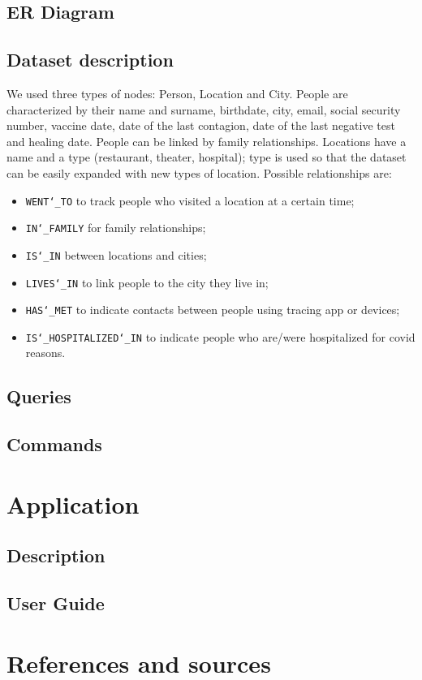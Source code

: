 \documentclass[12pt, a4paper]{article}
\begin{document}
\subsection{ER Diagram}

\blindtext

\subsection{Dataset description}

We used three types of nodes: Person, Location and City. 
People are characterized by their name and surname, birthdate, city, email, social security number, vaccine date, date of the last contagion, date of the last negative test and healing date. People can be linked by family relationships.
Locations have a name and a type (restaurant, theater, hospital); type is used so that the dataset can be easily expanded with new types of location.
Possible relationships are: 
\begin{itemize}
	\item \texttt{WENT\char`_TO} to track people who visited a location at a certain time;
	\item \texttt{IN\char`_FAMILY} for family relationships;
	\item \texttt{IS\char`_IN} between locations and cities;
	\item \texttt{LIVES\char`_IN} to link people to the city they live in;
	\item \texttt{HAS\char`_MET} to indicate contacts between people using tracing app or devices;
	\item \texttt{IS\char`_HOSPITALIZED\char`_IN} to indicate people who are/were hospitalized for covid reasons.
\end{itemize}

\subsection{Queries}

\blindtext

\subsection{Commands}

\blindtext

\clearpage

\section{Application}

\subsection{Description}

\blindtext

\subsection{User Guide}

\blindtext

\clearpage

\section{References and sources}

\blindtext

\clearpage
\end{document}

